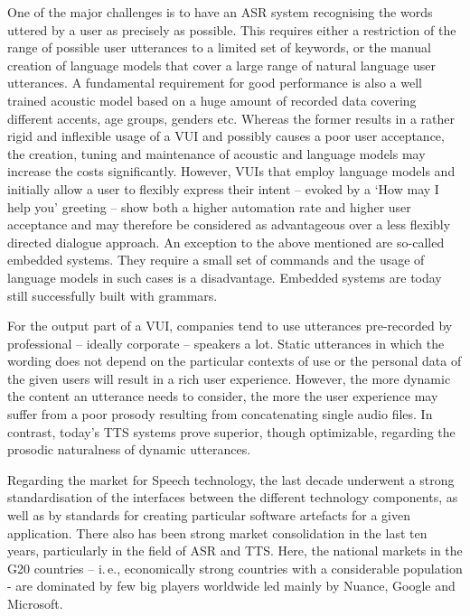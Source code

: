 \begin{multicols}{2}
One of the major challenges is to have an ASR system recognising the words uttered by a user as precisely as possible. This requires either a restriction of the range of possible user utterances to a limited set of keywords, or the manual creation of language models that cover a large range of natural language user utterances. A fundamental requirement for good performance is also a well trained acoustic model based on a huge amount of recorded data covering different accents, age groups, genders etc. Whereas the former results in a rather rigid and inflexible usage of a VUI and possibly causes a poor user acceptance, the creation, tuning and maintenance of acoustic and language models may increase the costs significantly. However, VUIs that employ language models and initially allow a user to flexibly express their intent – evoked by a ‘How may I help you’ greeting – show both a higher automation rate and higher user acceptance and may therefore be considered as advantageous over a less flexibly directed dialogue approach. An exception to the above mentioned are  so-called embedded systems. They require a  small set of commands and the usage of language models in such cases is a disadvantage. Embedded systems are today still successfully built with grammars. 

For the output part of a VUI, companies tend to use utterances pre-recorded by professional – ideally corporate – speakers a lot. Static utterances in which the wording does not depend on the particular contexts of use or the personal data of the given users will result in a rich user experience. However, the more dynamic the content an utterance needs to consider, the more the user experience may suffer from a poor prosody resulting from concatenating single audio files. In contrast, today’s TTS systems prove superior, though optimizable, regarding the prosodic naturalness of dynamic utterances.  

Regarding the market for Speech technology, the last decade underwent a strong standardisation of the interfaces between the different technology components, as well as by standards for creating particular software artefacts for a given application. There also has been strong market consolidation in the last ten years, particularly in the field of ASR and TTS. Here, the national markets in the G20 countries – i.\,e., economically strong countries with a considerable population - are dominated by few big players worldwide led mainly by Nuance, Google and Microsoft. 


\end{multicols}
